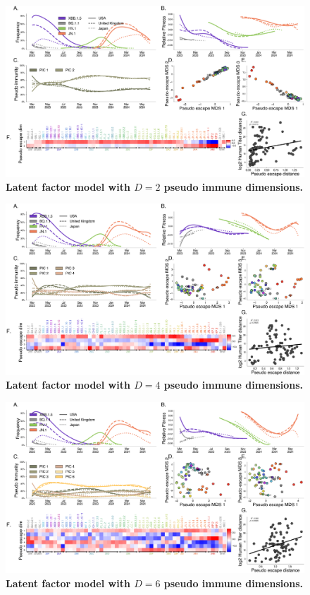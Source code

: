 \documentclass[11pt,oneside,letterpaper]{article}
\begin{document}
\begin{figure}[t!]
    \centering
    \includegraphics[width=1.0\textwidth=0.01]{./supplementary_figures/latent_immune_2_dims.png}
    \caption{
      \textbf{Latent factor model with $D=2$ pseudo immune dimensions.}
    }
    \label{fig:latent_factor_2}
\end{figure}

\begin{figure}[t!]
    \centering
    \includegraphics[width=1.0\textwidth=0.01]{./supplementary_figures/latent_immune_4_dims.png}
    \caption{
      \textbf{Latent factor model with $D=4$ pseudo immune dimensions.}
    }
    \label{fig:latent_factor_4}
\end{figure}

\begin{figure}[t!]
    \centering
    \includegraphics[width=1.0\textwidth=0.01]{./supplementary_figures/latent_immune_6_dims.png}
    \caption{
      \textbf{Latent factor model with $D=6$ pseudo immune dimensions.}
    }
    \label{fig:latent_factor_6}
\end{figure}
\end{document}
